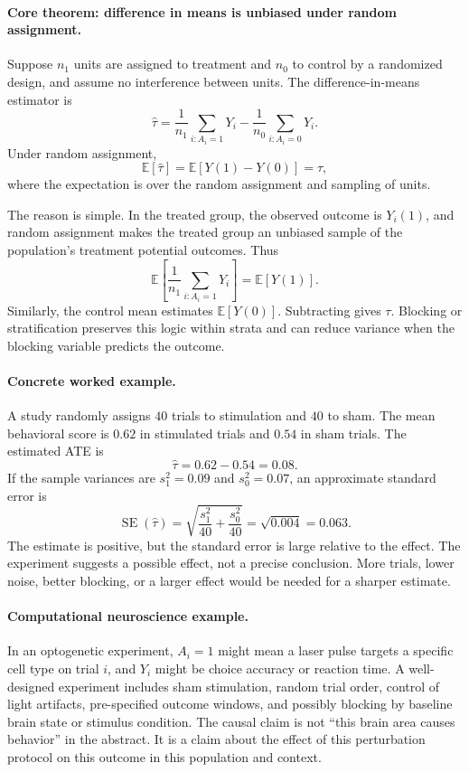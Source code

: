 \paragraph{Core theorem: difference in means is unbiased under random assignment.}
Suppose \(n_1\) units are assigned to treatment and \(n_0\) to control by a randomized design, and assume no interference between units. The difference-in-means estimator is
\[
\widehat{\tau}
=\frac{1}{n_1}\sum_{i:A_i=1}Y_i
-\frac{1}{n_0}\sum_{i:A_i=0}Y_i.
\]
Under random assignment,
\[
\mathbb E[\widehat{\tau}]=\mathbb E[Y(1)-Y(0)]=\tau,
\]
where the expectation is over the random assignment and sampling of units.

The reason is simple. In the treated group, the observed outcome is \(Y_i(1)\), and random assignment makes the treated group an unbiased sample of the population's treatment potential outcomes. Thus
\[
\mathbb E\left[\frac{1}{n_1}\sum_{i:A_i=1}Y_i\right]=\mathbb E[Y(1)].
\]
Similarly, the control mean estimates \(\mathbb E[Y(0)]\). Subtracting gives \(\tau\). Blocking or stratification preserves this logic within strata and can reduce variance when the blocking variable predicts the outcome.

\paragraph{Concrete worked example.}
A study randomly assigns \(40\) trials to stimulation and \(40\) to sham. The mean behavioral score is \(0.62\) in stimulated trials and \(0.54\) in sham trials. The estimated ATE is
\[
\widehat{\tau}=0.62-0.54=0.08.
\]
If the sample variances are \(s_1^2=0.09\) and \(s_0^2=0.07\), an approximate standard error is
\[
\operatorname{SE}(\widehat{\tau})
=\sqrt{\frac{s_1^2}{40}+\frac{s_0^2}{40}}
=\sqrt{0.004}=0.063.
\]
The estimate is positive, but the standard error is large relative to the effect. The experiment suggests a possible effect, not a precise conclusion. More trials, lower noise, better blocking, or a larger effect would be needed for a sharper estimate.

\paragraph{Computational neuroscience example.}
In an optogenetic experiment, \(A_i=1\) might mean a laser pulse targets a specific cell type on trial \(i\), and \(Y_i\) might be choice accuracy or reaction time. A well-designed experiment includes sham stimulation, random trial order, control of light artifacts, pre-specified outcome windows, and possibly blocking by baseline brain state or stimulus condition. The causal claim is not ``this brain area causes behavior'' in the abstract. It is a claim about the effect of this perturbation protocol on this outcome in this population and context.

